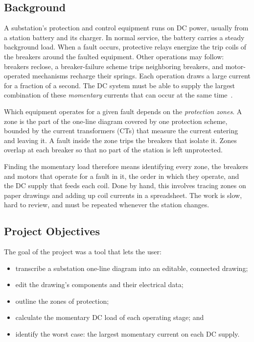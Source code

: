 \subsection{Background}

A substation's protection and control equipment runs on DC power, usually from a
station battery and its charger. In normal service, the battery carries a steady
background load. When a fault occurs, protective relays energize the trip coils of the
breakers around the faulted equipment. Other operations may follow: breakers reclose,
a breaker-failure scheme trips neighboring breakers, and motor-operated mechanisms
recharge their springs. Each operation draws a large current for a fraction of a
second. The DC system must be able to supply the largest combination of these
\emph{momentary} currents that can occur at the same time~\cite{ieee946}.

Which equipment operates for a given fault depends on the \emph{protection zones}. A
zone is the part of the one-line diagram covered by one protection scheme, bounded by
the current transformers (CTs) that measure the current entering and leaving it. A
fault inside the zone trips the breakers that isolate it. Zones overlap at each
breaker so that no part of the station is left unprotected.

Finding the momentary load therefore means identifying every zone, the breakers and
motors that operate for a fault in it, the order in which they operate, and the DC
supply that feeds each coil. Done by hand, this involves tracing zones on paper
drawings and adding up coil currents in a spreadsheet. The work is slow, hard to
review, and must be repeated whenever the station changes.

\subsection{Project Objectives}

The goal of the project was a tool that lets the user:

\begin{itemize}
  \item transcribe a substation one-line diagram into an editable, connected drawing;
  \item edit the drawing's components and their electrical data;
  \item outline the zones of protection;
  \item calculate the momentary DC load of each operating stage; and
  \item identify the worst case: the largest momentary current on each DC supply.
\end{itemize}

